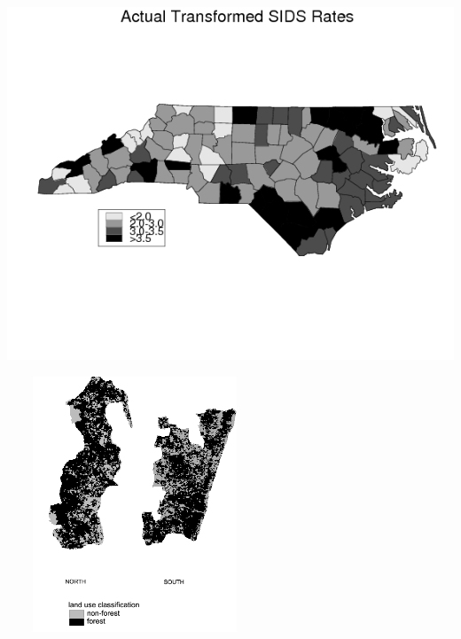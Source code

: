 \documentclass[10pt]{beamer}
\begin{document}
\begin{frame}


\begin{center}
\includegraphics[width=\textwidth, height=0.8\textheight]{figs/nchoriz.png}
\end{center}

\end{frame}

\begin{frame}
 
\begin{center}
\includegraphics[width=3.0in,height=3.0in] {figs/fig3.png}
\end{center}

\end{frame}
\end{document}
